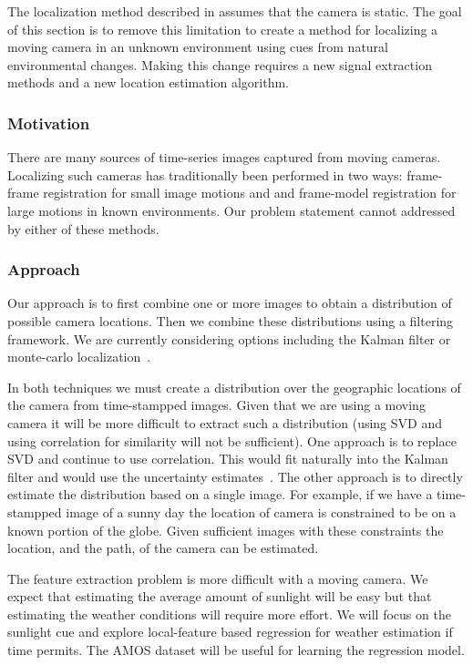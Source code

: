 The localization method described in 
assumes that the camera is static.  The goal of this section is to
remove this limitation to create a method for localizing a moving
camera in an unknown environment using cues from natural environmental
changes.  Making this change requires a new signal extraction methods
and a new location estimation algorithm.

\subsubsection{Motivation}

There are many sources of time-series images captured from moving
cameras.  Localizing such cameras has traditionally been performed in
two ways: frame-frame registration for small image motions and and
frame-model registration for large motions in known environments.  Our
problem statement cannot addressed by either of these methods.

\subsubsection{Approach}

Our approach is to first combine one or more images to obtain a
distribution of possible camera locations.  Then we combine these
distributions using a filtering framework.  We are currently
considering options including the Kalman filter or monte-carlo
localization~\cite{mcl}.

In both techniques we must create a distribution over the geographic
locations of the camera from time-stampped images.  Given that we are
using a moving camera it will be more difficult to extract such a
distribution (using SVD and using correlation for similarity will not
be sufficient).  One approach is to replace SVD and continue to use
correlation.  This would fit naturally into the Kalman filter and
would use the uncertainty estimates~.  The
other approach is to directly estimate the distribution based on a
single image.  For example, if we have a time-stampped image of a
sunny day the location of camera is constrained to be on a known
portion of the globe.  Given sufficient images with these constraints
the location, and the path, of the camera can be estimated.

The feature extraction problem is more difficult with a moving camera.
We expect that estimating the average amount of sunlight will be easy
but that estimating the weather conditions will require more effort.
We will focus on the sunlight cue and explore local-feature based
regression for weather estimation if time permits.  The AMOS dataset
will be useful for learning the regression model.

